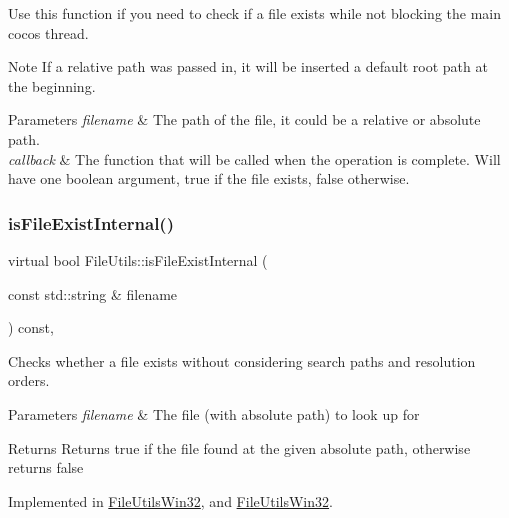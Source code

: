 Use this function if you need to check if a file exists while not blocking the main cocos thread.

\begin{DoxyNote}{Note}
If a relative path was passed in, it will be inserted a default root path at the beginning. 
\end{DoxyNote}

\begin{DoxyParams}{Parameters}
{\em filename} & The path of the file, it could be a relative or absolute path. \\
\hline
{\em callback} & The function that will be called when the operation is complete. Will have one boolean argument, true if the file exists, false otherwise. \\
\hline
\end{DoxyParams}
\mbox{\label{classFileUtils_a0e1dc78cbe5ac5689e1f67ebd4413bab}} 
\subsubsection{\texorpdfstring{is\+File\+Exist\+Internal()}{isFileExistInternal()}\hspace{0.1cm}{\footnotesize\ttfamily [1/2]}}
{\footnotesize\ttfamily virtual bool File\+Utils\+::is\+File\+Exist\+Internal (\begin{DoxyParamCaption}\item[{const std\+::string \&}]{filename }\end{DoxyParamCaption}) const\hspace{0.3cm}{\ttfamily [protected]}, {}}

Checks whether a file exists without considering search paths and resolution orders. 
\begin{DoxyParams}{Parameters}
{\em filename} & The file (with absolute path) to look up for \\
\hline
\end{DoxyParams}
\begin{DoxyReturn}{Returns}
Returns true if the file found at the given absolute path, otherwise returns false 
\end{DoxyReturn}


Implemented in \hyperlink{classFileUtilsWin32_aacf984dcf838fc8d3303e47eb33a8601}{File\+Utils\+Win32}, and \hyperlink{classFileUtilsWin32_ab3538e3fa4418afbff4e95858a553ff7}{File\+Utils\+Win32}.

